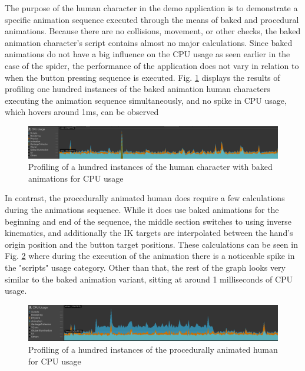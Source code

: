 The purpose of the human character in the demo application is to demonstrate
a specific animation sequence executed through the means of baked and procedural
animations. Because there are no collisions, movement, or other checks, the baked
animation character's script contains almost no major calculations. Since
baked animations do not have a big influence on the CPU usage as seen earlier in
the case of the spider, the performance of the application does not vary in
relation to when the button pressing sequence is executed. Fig.
\ref{fig:pr_h_b} displays the results of profiling one hundred instances of the
baked animation human characters executing the animation sequence
simultaneously, and no spike in CPU usage, which hovers around 1ms, can be
observed

\begin{figure}[h!]
    \centering
    \captionsetup{justification=centering}
    \includegraphics[width=\textwidth]{grafika/pr_h_b.eps}
    \caption{Profiling of a hundred instances of the human character with baked
    animations for CPU usage}
    \label{fig:pr_h_b}
\end{figure}

In contrast, the procedurally animated human does require a few calculations
during the animations sequence. While it does use baked animations for the
beginning and end of the sequence, the middle section switches to using inverse
kinematics, and additionally the IK targets are interpolated between the hand's
origin position and the button target positions. These calculations can be
seen in Fig. \ref{fig:pr_h_ik} where during the execution of the animation
there is a noticeable spike in the "scripts" usage category. Other than that,
the rest of the graph looks very similar to the baked animation variant, sitting
at around 1 milliseconds of CPU usage.

\begin{figure}[h!]
    \centering
    \captionsetup{justification=centering}
    \includegraphics[width=\textwidth]{grafika/pr_h_ik.eps}
    \caption{Profiling of a hundred instances of the procedurally animated human
    for CPU usage}
    \label{fig:pr_h_ik}
\end{figure}


